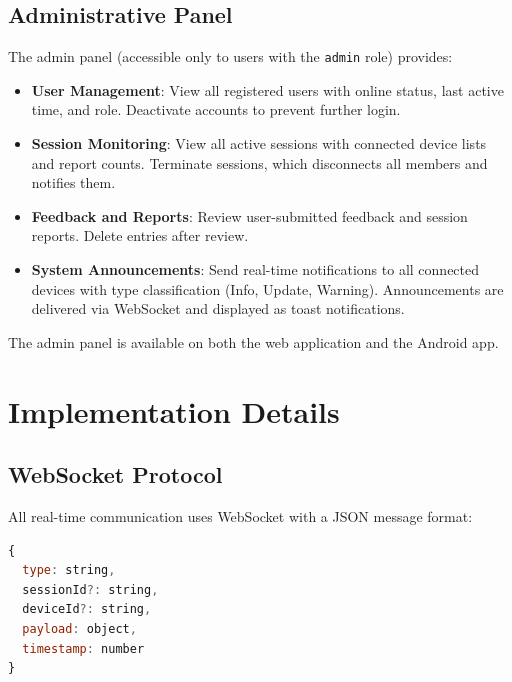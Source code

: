\documentclass[conference]{IEEEtran}
\begin{document}
\subsection{Administrative Panel}

The admin panel (accessible only to users with the \texttt{admin} role) provides:

\begin{itemize}
    \item \textbf{User Management}: View all registered users with online status, last active time, and role. Deactivate accounts to prevent further login.
    \item \textbf{Session Monitoring}: View all active sessions with connected device lists and report counts. Terminate sessions, which disconnects all members and notifies them.
    \item \textbf{Feedback and Reports}: Review user-submitted feedback and session reports. Delete entries after review.
    \item \textbf{System Announcements}: Send real-time notifications to all connected devices with type classification (Info, Update, Warning). Announcements are delivered via WebSocket and displayed as toast notifications.
\end{itemize}

The admin panel is available on both the web application and the Android app.

\section{Implementation Details}

\subsection{WebSocket Protocol}

All real-time communication uses WebSocket with a JSON message format:

\begin{lstlisting}[language=JavaScript]
{
  type: string,
  sessionId?: string,
  deviceId?: string,
  payload: object,
  timestamp: number
}
\end{lstlisting}
\end{document}
